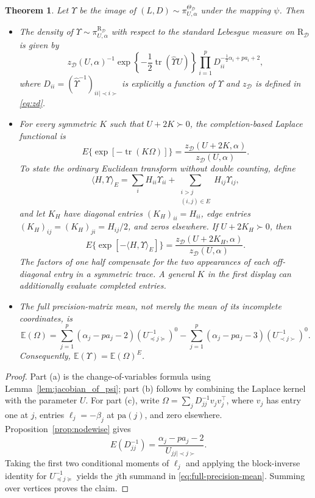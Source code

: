 \documentclass[12pt]{article}
\DeclareMathOperator{\tr}{tr}
\newcommand{\D}{\mathcal{D}}
\theoremstyle{plain}
\newtheorem{theorem}{Theorem}[section]
\theoremstyle{definition}
\theoremstyle{remark}
\begin{document}
 \begin{theorem}\label{thmn:rd}
 Let $\Upsilon$ be the image of $\left(L,D\right)\sim \pi_{U,\alpha}^{\Theta_{\D}}$ under the mapping $\psi$. Then
 \begin{itemize}
 \renewcommand{\labelitemi}{a)}
 \item The density of $\Upsilon\sim \pi^{\mathrm{R}_{\D}}_{U, \alpha}$  with respect to  the standard Lebesgue measure on  $\mathrm{R}_{\D}$ is given by
 \[
 z_{\D}(U,\alpha)^{-1}\exp\left\{-\frac{1}{2}\tr(\widehat{\Upsilon} U)\right\}\prod_{i=1}^{p} D_{ii}^ {-\frac{1}{2}\alpha_i+pa_i+2},
 \]
 where  $D_{ii}=\left(\widehat{\Upsilon}^{-1}\right)_{ii|\prec i\succ}$ is explicitly a function of $\Upsilon$ and $z_{\D}$ is defined in \eqref{eq:zd}.
 \renewcommand{\labelitemi}{b)}
 \item For every symmetric \(K\) such that \(U+2K\succ0\), the
 completion-based Laplace functional is
 \[
 E\{\exp[-\tr(K\Omega)]\}
 =\frac{z_{\D}(U+2K,\alpha)}{z_{\D}(U,\alpha)}.
 \]
 To state the ordinary Euclidean transform without double counting, define
 \[
 \langle H,\Upsilon\rangle_E
 =\sum_i H_{ii}\Upsilon_{ii}
  +\sum_{\substack{i>j\\(i,j)\in E}}H_{ij}\Upsilon_{ij},
 \]
 and let \(K_H\) have diagonal entries \((K_H)_{ii}=H_{ii}\), edge
 entries \((K_H)_{ij}=(K_H)_{ji}=H_{ij}/2\), and zeros elsewhere.  If
 \(U+2K_H\succ0\), then
 \[
 E\{\exp[-\langle H,\Upsilon\rangle_E]\}
 =\frac{z_{\D}(U+2K_H,\alpha)}{z_{\D}(U,\alpha)}.
 \]
 The factors of one half compensate for the two appearances of each
 off-diagonal entry in a symmetric trace.  A general \(K\) in the first
 display can additionally evaluate completed entries.
 \renewcommand{\labelitemi}{c)}
 \item The full precision-matrix mean, not merely the mean of its
 incomplete coordinates, is
 \begin{equation}\label{eq:full-precision-mean}
 \mathbb{E}(\Omega)
 =\sum_{j=1}^{p}(\alpha_j-pa_j-2)
   \left(U_{\preceq j\succeq}^{-1}\right)^0
 -\sum_{j=1}^{p}(\alpha_j-pa_j-3)
   \left(U_{\prec j\succ}^{-1}\right)^0.
 \end{equation}
 Consequently, \(\mathbb{E}(\Upsilon)=\mathbb{E}(\Omega)^E\).
 \end{itemize}
 \end{theorem}

\begin{proof}
Part (a) is the change-of-variables formula using
Lemma~\ref{lem:jacobian_of_psi}; part (b) follows by combining the
Laplace kernel with the parameter \(U\).  For part (c), write
\(\Omega=\sum_jD_{jj}^{-1}v_jv_j^\top\), where \(v_j\) has entry one at
\(j\), entries \(\ell_j=-\beta_j\) at \(\mathrm{pa}(j)\), and zero
elsewhere.  Proposition~\ref{prop:nodewise} gives
\[
E(D_{jj}^{-1})=
\frac{\alpha_j-pa_j-2}{U_{jj\mid\prec j\succ}}.
\]
Taking the first two conditional moments of \(\ell_j\) and applying the
block-inverse identity for \(U_{\preceq j\succeq}^{-1}\) yields the
\(j\)th summand in \eqref{eq:full-precision-mean}.  Summing over
vertices proves the claim.
\end{proof}
 
\end{document}
